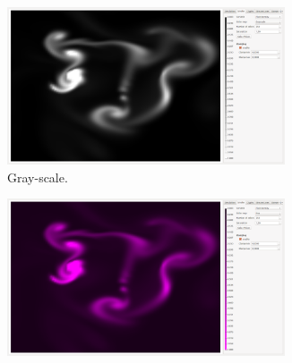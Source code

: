 \begin{figure}[htb]
\centering
\ContinuedFloat
	\begin{subfigure}{0.35\textwidth}
		\centering
		\includegraphics[width=0.9\textwidth, trim={35px 30px 430px 30px}, clip]{colormapping/img/grayscale}
		\caption{
		Gray-scale.
		}
		\label{fig:colormapping:intro:differntColorMaps:grayscale}
	\end{subfigure}
		\hspace{30px}
	\begin{subfigure}{0.35\textwidth}
		\centering
		\includegraphics[width=0.9\textwidth, trim={35px 30px 430px 30px}, clip]{colormapping/img/hue}

\end{subfigure}
\end{figure}
